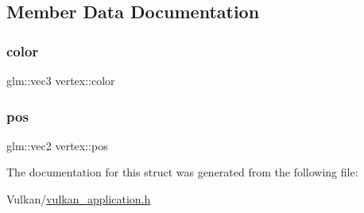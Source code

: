 \subsection{Member Data Documentation}
\mbox{\label{structvertex_a6b9a4d49465117369bc1eb347e6e65b2}} 
\subsubsection{\texorpdfstring{color}{color}}
{\footnotesize\ttfamily glm\+::vec3 vertex\+::color}

\mbox{\label{structvertex_ae79e06bf578bc411c75a3d35d91e020b}} 
\subsubsection{\texorpdfstring{pos}{pos}}
{\footnotesize\ttfamily glm\+::vec2 vertex\+::pos}



The documentation for this struct was generated from the following file\+:\begin{DoxyCompactItemize}
\item 
Vulkan/\mbox{\hyperlink{vulkan__application_8h}{vulkan\+\_\+application.\+h}}\end{DoxyCompactItemize}
